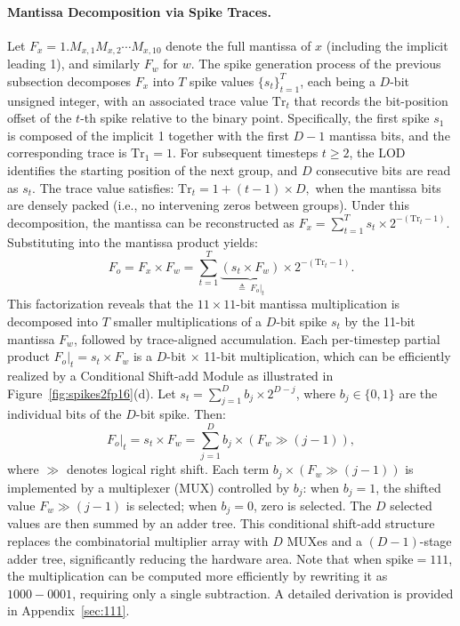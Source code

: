 \paragraph{Mantissa Decomposition via Spike Traces.}
Let $F_x = 1.M_{x,1} M_{x,2} \cdots M_{x,10}$ denote the full mantissa of $x$ (including the implicit leading 1), and similarly $F_w$ for $w$. The spike generation process of the previous subsection decomposes $F_x$ into $T$ spike values $\{s_t\}_{t=1}^{T}$, each being a $D$-bit unsigned integer, with an associated trace value $\mathrm{Tr}_t$ that records the bit-position offset of the $t$-th spike relative to the binary point. Specifically, the first spike $s_1$ is composed of the implicit 1 together with the first $D-1$ mantissa bits, and the corresponding trace is $\mathrm{Tr}_1 = 1$. For subsequent timesteps $t \geq 2$, the LOD identifies the starting position of the next group, and $D$ consecutive bits are read as $s_t$. The trace value satisfies:
$
\mathrm{Tr}_t = 1 + (t-1) \times D,
$
when the mantissa bits are densely packed (i.e., no intervening zeros between groups). Under this decomposition, the mantissa can be reconstructed as $F_x = \sum_{t=1}^{T} s_t \times 2^{-(\mathrm{Tr}_t - 1)}.$ 
Substituting into the mantissa product yields:
\begin{equation}\label{eq:mantissa_product}
F_o = F_x \times F_w = \sum_{t=1}^{T} \underbrace{(s_t \times F_w)}_{\triangleq\; F_{o}|_t} \times 2^{-(\mathrm{Tr}_t - 1)}.
\end{equation}
This factorization reveals that the $11 \times 11$-bit mantissa multiplication is decomposed into $T$ smaller multiplications of a $D$-bit spike $s_t$ by the 11-bit mantissa $F_w$, followed by trace-aligned accumulation. Each per-timestep partial product $F_{o}|_t = s_t \times F_w$ is a $D$-bit $\times$ 11-bit multiplication, which can be efficiently realized by a Conditional Shift-add Module as illustrated in Figure~\ref{fig:spikes2fp16}(d). Let $s_t = \sum_{j=1}^{D} b_j \times 2^{D-j}$, where $b_j \in \{0,1\}$ are the individual bits of the $D$-bit spike. Then:
\begin{equation}\label{eq:shift_add}
F_{o}|_t = s_t \times F_w = \sum_{j=1}^{D} b_j \times (F_w \gg (j-1)),
\end{equation}
where $\gg$ denotes logical right shift. Each term $b_j \times (F_w \gg (j-1))$ is implemented by a multiplexer (MUX) controlled by $b_j$: when $b_j = 1$, the shifted value $F_w \gg (j-1)$ is selected; when $b_j = 0$, zero is selected. The $D$ selected values are then summed by an adder tree. This conditional shift-add structure replaces the combinatorial multiplier array with $D$ MUXes and a $(D-1)$-stage adder tree, significantly reducing the hardware area. Note that when $\text{spike} = 111$, the multiplication can be computed more efficiently by rewriting it as $1000 - 0001$, requiring only a single subtraction. A detailed derivation is provided in Appendix~\ref{sec:111}.
 
